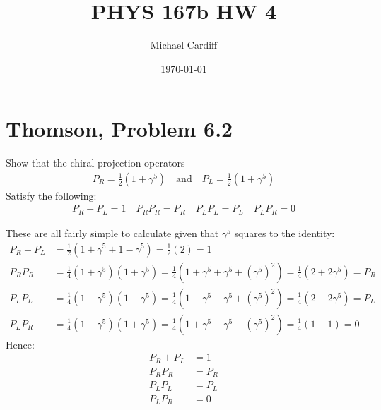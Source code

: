 \documentclass[12pt]{article}
\title{\vspace{-3em}PHYS 167b HW 4}
\author{Michael Cardiff}
\date{\today}
\begin{document}
\maketitle

\section{Thomson, Problem 6.2}
\begin{problem}
  Show that the chiral projection operators
  \begin{align*}
    P_R=\frac12(1+\gamma^5)\quad\text{and}\quad P_L=\frac12(1+\gamma^5)
  \end{align*}
  Satisfy the following:
  \begin{align*}
    P_R+P_L=1\quad
    P_R P_R=P_R\quad
    P_L P_L=P_L\quad
    P_L P_R=0
  \end{align*}
\end{problem}
These are all fairly simple to calculate given that $\gamma^5$ squares to the identity:
\begin{align*}
  P_R+P_L&=\frac12(1+\gamma^5+1-\gamma^5)=\frac12(2)=1\\
  P_R P_R&=\frac14(1+\gamma^5)(1+\gamma^5)=
  \frac14(1+\gamma^5+\gamma^5+{(\gamma^5)}^2)=\frac14(2+2\gamma^5)=P_R\\
  P_L P_L&=\frac14(1-\gamma^5)(1-\gamma^5)=
  \frac14(1-\gamma^5-\gamma^5+{(\gamma^5)}^2)=\frac14(2-2\gamma^5)=P_L\\
  P_L P_R&=\frac14(1-\gamma^5)(1+\gamma^5)=
  \frac14(1+\gamma^5-\gamma^5-{(\gamma^5)}^2)=\frac14(1-1)=0
\end{align*}
Hence:
\begin{equation}
  \label{eq:p1}
  \boxed{
    \begin{aligned}
      P_R+P_L&=1\\
      P_R P_R&=P_R\\
      P_L P_L&=P_L\\
      P_L P_R&=0
    \end{aligned}
  }
\end{equation}
\newpage
\end{document}
